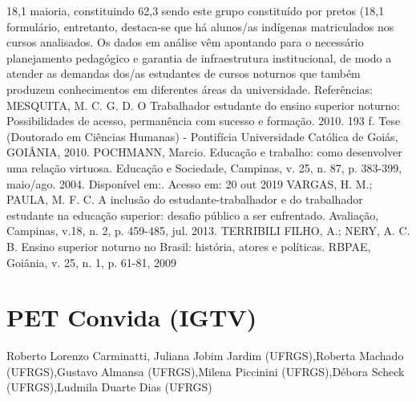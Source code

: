 18,1%
maioria, constituindo 62,3%
sendo este grupo constituído por pretos (18,1%
formulário, entretanto, destaca-se que há alunos/as indígenas matriculados nos cursos analisados. Os dados em
análise vêm apontando para o necessário planejamento pedagógico e garantia de infraestrutura institucional, de
modo a atender as demandas dos/as estudantes de cursos noturnos que também produzem conhecimentos em
diferentes áreas da universidade.
Referências:
MESQUITA, M. C. G. D. O Trabalhador estudante do ensino superior noturno: Possibilidades de acesso,
permanência com sucesso e formação. 2010. 193 f. Tese (Doutorado em Ciências Humanas) - Pontifícia
Universidade Católica de Goiás, GOIÂNIA, 2010.
POCHMANN, Marcio. Educação e trabalho: como desenvolver uma relação virtuosa. Educação e Sociedade,
Campinas, v. 25, n. 87, p. 383-399, maio/ago. 2004. Disponível em:. Acesso em: 20
out 2019
VARGAS, H. M.; PAULA, M. F. C. A inclusão do estudante-trabalhador e do trabalhador estudante na educação
superior: desafio público a ser enfrentado. Avaliação, Campinas, v.18, n. 2, p. 459-485, jul. 2013.
TERRIBILI FILHO, A.; NERY, A. C. B. Ensino superior noturno no Brasil: história, atores e políticas. RBPAE,
Goiânia, v. 25, n. 1, p. 61-81, 2009



\section{PET Convida (IGTV)}

Roberto Lorenzo Carminatti, Juliana Jobim Jardim (UFRGS),Roberta Machado (UFRGS),Gustavo Almansa (UFRGS),Milena Piccinini (UFRGS),Débora Scheck (UFRGS),Ludmila Duarte Dias (UFRGS)

